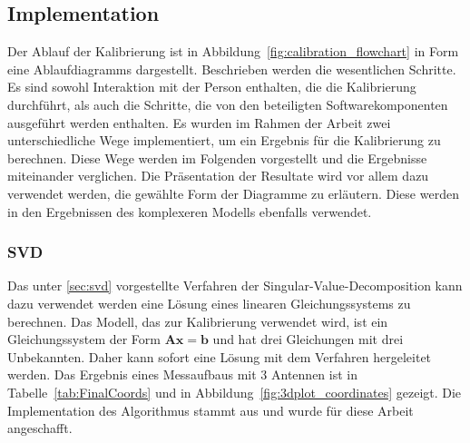 \subsection{Implementation}
%
Der Ablauf der Kalibrierung ist in Abbildung~\ref{fig:calibration_flowchart} in Form eine Ablaufdiagramms dargestellt. Beschrieben werden die wesentlichen Schritte. Es sind sowohl Interaktion mit der Person enthalten, die die Kalibrierung durchführt, als auch die Schritte, die von den beteiligten Softwarekomponenten ausgeführt werden enthalten. Es wurden im Rahmen der Arbeit zwei unterschiedliche Wege implementiert, um ein Ergebnis für die Kalibrierung zu berechnen. Diese Wege werden im Folgenden vorgestellt und die Ergebnisse miteinander verglichen. Die Präsentation der Resultate wird vor allem dazu verwendet werden, die gewählte Form der Diagramme zu erläutern. Diese werden in den Ergebnissen des komplexeren Modells ebenfalls verwendet.
%
\subsubsection{SVD}
%
Das unter \ref{sec:svd} vorgestellte Verfahren der Singular-Value-Decomposition kann dazu verwendet werden eine Lösung eines linearen Gleichungssystems zu berechnen. Das Modell, das zur Kalibrierung verwendet wird, ist ein Gleichungssystem der Form $\mathbf{A}\mathbf{x}=\mathbf{b}$ und hat drei Gleichungen mit drei Unbekannten. Daher kann sofort eine Lösung mit dem Verfahren hergeleitet werden. Das Ergebnis eines Messaufbaus mit 3 Antennen ist in Tabelle~\ref{tab:FinalCoords} und in Abbildung~\ref{fig:3dplot_coordinates} gezeigt. Die Implementation des Algorithmus stammt aus \cite{press2007numerical} und wurde für diese Arbeit angeschafft.
%
